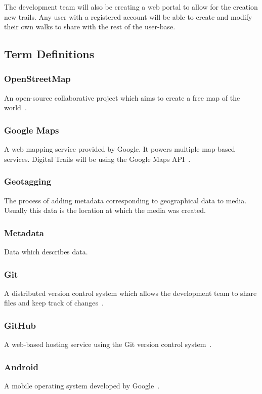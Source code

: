 \documentclass[11pt,a4paper]{article}
\begin{document}
The development team will also be creating a web portal to allow for the creation new trails. Any user with a registered account will be able to create and modify their own walks to share with the rest of the user-base.

\subsection{Term Definitions}
\label{sec:terms}

\subsubsection{OpenStreetMap}
An open-source collaborative project which aims to create a free map of the world~\cite{OSM}.

\subsubsection{Google Maps}
A web mapping service provided by Google. It powers multiple map-based services. Digital Trails will be using the Google Maps API~\cite{googleAPI}.

\subsubsection{Geotagging}
The process of adding metadata corresponding to geographical data to media. Usually this data is the location at which the media was created.

\subsubsection{Metadata}
Data which describes data.

\subsubsection{Git}
A distributed version control system which allows the development team to share files and keep track of changes~\cite{git}.

\subsubsection{GitHub}
A web-based hosting service using the Git version control system~\cite{github}.

\subsubsection{Android}
A mobile operating system developed by Google~\cite{android}. 
\end{document}

